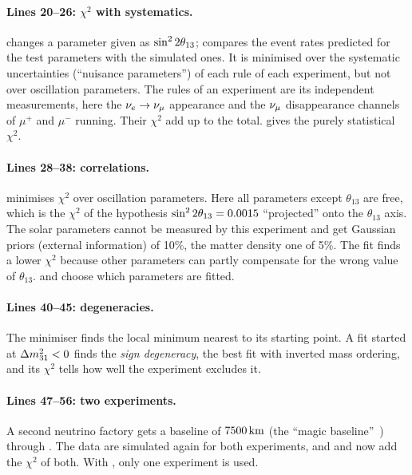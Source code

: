 \paragraph{Lines 20--26: $\chi^2$ with systematics.}  changes
a parameter given as $\sin^2 2\theta_{13}$;  compares the event rates predicted
for the test parameters with the simulated ones. It is minimised over the
systematic uncertainties (``nuisance parameters'') of each rule of each
experiment, but not over oscillation parameters. The rules of an experiment are
its independent measurements, here the $\nu_e\to\nu_\mu$ appearance and the
$\nu_\mu$ disappearance channels of $\mu^+$ and $\mu^-$ running. Their $\chi^2$
add up to the total.  gives the purely statistical
$\chi^2$.

\paragraph{Lines 28--38: correlations.}  minimises $\chi^2$
over oscillation parameters. Here all parameters except $\theta_{13}$ are free,
which is the $\chi^2$ of the hypothesis $\sin^2 2\theta_{13}=0.0015$ ``projected'' onto
the $\theta_{13}$ axis. The solar parameters cannot be measured by this
experiment and get Gaussian priors (external information) of 10\%, the matter
density one of 5\%. The fit finds a lower $\chi^2$ because other parameters can
partly compensate for the wrong value of $\theta_{13}$.  and
 choose which parameters are fitted.

\paragraph{Lines 40--45: degeneracies.} The minimiser finds the local minimum
nearest to its starting point. A fit started at $\Delta m^2_{31}<0$ finds the
\emph{sign degeneracy}, the best fit with inverted mass ordering, and its
$\chi^2$ tells how well the experiment excludes it.

\paragraph{Lines 47--56: two experiments.} A second neutrino factory gets a
baseline of $7500\,\mathrm{km}$ (the ``magic baseline''~\cite{Huber:2003pm}) through
. The data are simulated again for both experiments,
and  and  now add the $\chi^2$ of both. With
, only one experiment is used.

